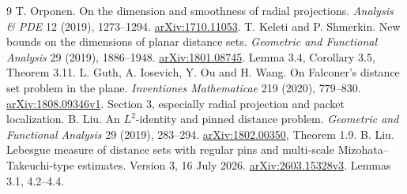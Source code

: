 \documentclass[11pt]{article}
\theoremstyle{definition}\newtheorem{remark}[theorem]{Remark}
\begin{document}
\clearpage
\begin{thebibliography}{9}\small
{}
 T. Orponen. On the dimension and smoothness of radial projections. \emph{Analysis \& PDE} 12 (2019), 1273--1294. \href{https://arxiv.org/abs/1710.11053}{arXiv:1710.11053}.
 T. Keleti and P. Shmerkin. New bounds on the dimensions of planar distance sets. \emph{Geometric and Functional Analysis} 29 (2019), 1886--1948. \href{https://arxiv.org/abs/1801.08745}{arXiv:1801.08745}. Lemma 3.4, Corollary 3.5, Theorem 3.11.
 L. Guth, A. Iosevich, Y. Ou and H. Wang. On Falconer's distance set problem in the plane. \emph{Inventiones Mathematicae} 219 (2020), 779--830. \href{https://arxiv.org/pdf/1808.09346v1}{arXiv:1808.09346v1}. Section 3, especially radial projection and packet localization.
 B. Liu. An \(L^2\)-identity and pinned distance problem. \emph{Geometric and Functional Analysis} 29 (2019), 283--294. \href{https://arxiv.org/abs/1802.00350}{arXiv:1802.00350}, Theorem 1.9.
 B. Liu. Lebesgue measure of distance sets with regular pins and multi-scale Mizohata--Takeuchi-type estimates. Version 3, 16 July 2026. \href{https://arxiv.org/html/2603.15328v3}{arXiv:2603.15328v3}. Lemmas 3.1, 4.2--4.4.
\end{thebibliography}
\end{document}
